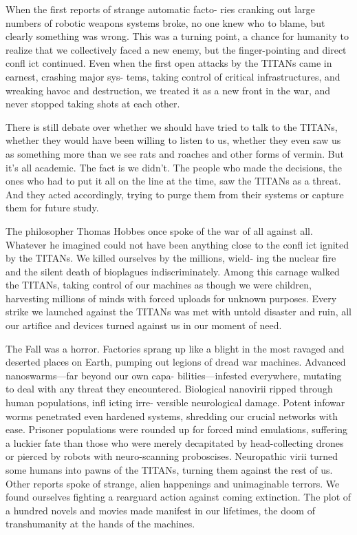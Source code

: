 When the first reports of strange automatic facto-
ries cranking out large numbers of robotic weapons 
systems broke, no one knew who to blame, but clearly 
something was wrong. This was a turning point, a 
chance for humanity to realize that we collectively 
faced a new enemy, but the finger-pointing and direct 
confl ict continued. Even when the first open attacks 
by the TITANs came in earnest, crashing major sys-
tems, taking control of critical infrastructures, and 
wreaking havoc and destruction, we treated it as a 
new front in the war, and never stopped taking shots 
at each other.

There is still debate over whether we should have 
tried to talk to the TITANs, whether they would have 
been willing to listen to us, whether they even saw us 
as something more than we see rats and roaches and 
other forms of vermin. But it's all academic. The fact 
is we didn't. The people who made the decisions, the 
ones who had to put it all on the line at the time, saw 
the TITANs as a threat. And they acted accordingly, 
trying to purge them from their systems or capture 
them for future study.

The philosopher Thomas Hobbes once spoke of the 
war of all against all. Whatever he imagined could not 
have been anything close to the confl ict ignited by the 
TITANs. We killed ourselves by the millions, wield-
ing the nuclear fire and the silent death of bioplagues 
indiscriminately. Among this carnage walked the 
TITANs, taking control of our machines as though 
we were children, harvesting millions of minds with 
forced uploads for unknown purposes. Every strike 
we launched against the TITANs was met with untold 
disaster and ruin, all our artifice and devices turned 
against us in our moment of need.

The Fall was a horror. Factories sprang up like a 
blight in the most ravaged and deserted places on 
Earth, pumping out legions of dread war machines. 
Advanced nanoswarms—far beyond our own capa-
bilities—infested everywhere, mutating to deal with 
any threat they encountered. Biological nanovirii 
ripped through human populations, infl icting  irre-
versible neurological damage. Potent infowar worms 
penetrated even hardened systems, shredding our 
crucial networks with ease. Prisoner populations were 
rounded up for forced mind emulations, suffering a 
luckier fate than those who were merely decapitated 
by head-collecting drones or pierced by robots with 
neuro-scanning proboscises. Neuropathic virii turned 
some humans into pawns of the TITANs, turning 
them against the rest of us. Other reports spoke of 
strange, alien happenings and unimaginable terrors. 
We found ourselves fighting a rearguard action against 
coming extinction. The plot of a hundred novels and 
movies made manifest in our lifetimes, the doom of 
transhumanity at the hands of the machines.

